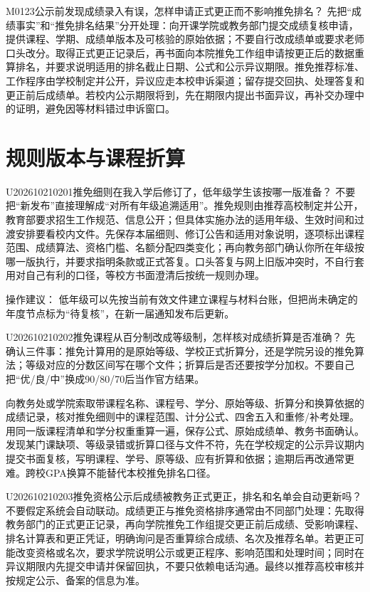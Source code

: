 
\begin{qa}{M0123}{公示前发现成绩录入有误，怎样申请正式更正而不影响推免排名？}
先把“成绩事实”和“推免排名结果”分开处理：向开课学院或教务部门提交成绩复核申请，提供课程、学期、成绩单版本及可核验的原始依据；不要自行改成绩单或要求老师口头改分。取得正式更正记录后，再书面向本院推免工作组申请按更正后的数据重算排名，并要求说明适用的排名截止日期、公式和公示异议期限。推免推荐标准、工作程序由学校制定并公开，异议应走本校申诉渠道；留存提交回执、处理答复和更正前后成绩单。若校内公示期限将到，先在期限内提出书面异议，再补交办理中的证明，避免因等材料错过申诉窗口。
\end{qa}

\setcounter{section}{13}
\section{规则版本与课程折算}
\begin{qa}{U202610210201}{推免细则在我入学后修订了，低年级学生该按哪一版准备？}
不要把“新发布”直接理解成“对所有年级追溯适用”。推免规则由推荐高校制定并公开，教育部要求招生工作规范、信息公开；但具体实施办法的适用年级、生效时间和过渡安排要看校内文件。先保存本届细则、修订公告和适用对象说明，逐项标出课程范围、成绩算法、资格门槛、名额分配四类变化；再向教务部门确认你所在年级按哪一版执行，并要求指明条款或正式答复。口头答复与网上旧版冲突时，不自行套用对自己有利的口径，等校方书面澄清后按统一规则办理。

操作建议： 低年级可以先按当前有效文件建立课程与材料台账，但把尚未确定的年度节点标为“待复核”，在新一届通知发布后更新。
\end{qa}
\begin{qa}{U202610210202}{推免课程从百分制改成等级制，怎样核对成绩折算是否准确？}
先确认三件事：推免计算用的是原始等级、学校正式折算分，还是学院另设的推免算法；等级对应的分数区间写在哪个文件；折算后是否还要按学分加权。不要自己把“优/良/中”换成90/80/70后当作官方结果。

向教务处或学院索取带课程名称、课程号、学分、原始等级、折算分和换算依据的成绩记录，核对推免细则中的课程范围、计分公式、四舍五入和重修/补考处理。用同一版课程清单和学分权重重算一遍，保存公式、原始成绩单、教务书面确认。发现某门课缺项、等级录错或折算口径与文件不符，先在学校规定的公示异议期内提交书面复核，写明课程、学号、原等级、应有折算和依据；逾期后再改通常更难。跨校GPA换算不能替代本校推免排名口径。
\end{qa}
\begin{qa}{U202610210203}{推免资格公示后成绩被教务正式更正，排名和名单会自动更新吗？}
不要假定系统会自动联动。成绩更正与推免资格排序通常由不同部门处理：先取得教务部门的正式更正记录，再向学院推免工作组提交更正前后成绩、受影响课程、排名计算表和更正凭证，明确询问是否重算综合成绩、名次及推荐名单。若更正可能改变资格或名次，要求学院说明公示或更正程序、影响范围和处理时间；同时在异议期限内先提交申请并保留回执，不要只依赖电话沟通。最终以推荐高校审核并按规定公示、备案的信息为准。 
\end{qa}

